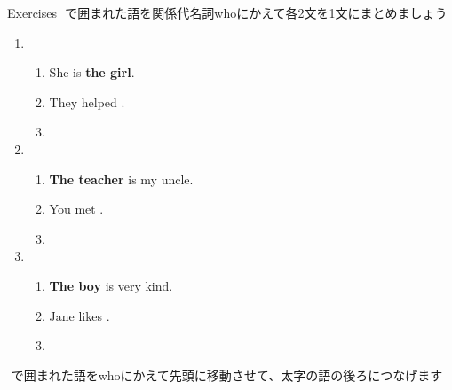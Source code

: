 \documentclass[aspectratio=169,xcolor={dvipsnames,table}]{beamer}
\begin{document}
\begin{frame}[plain]{Exercises}
\fbox{　　}\,\,で囲まれた語を関係代名詞whoにかえて各2文を1文にまとめましょう%
\mbox{}\hfill{\scriptsize {}}
\begin{enumerate}
 \item \begin{enumerate}
	\item She is {\bfseries the girl}.
	\item They helped .
	\item {}
       \end{enumerate}
 \item \begin{enumerate}
	\item {\bfseries The teacher} is my uncle.
	\item You met .
	\item {}
       \end{enumerate}
 \item \begin{enumerate}
	\item {\bfseries The boy} is very kind.
	\item Jane likes .
	\item {}
       \end{enumerate}
\end{enumerate} 

\hfill\fbox{　　}\,\,で囲まれた語をwhoにかえて先頭に移動させて、太字の語の後ろにつなげます
\end{frame}
\end{document}
